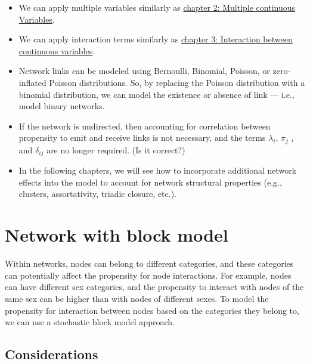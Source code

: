 \documentclass[
  letterpaper,
  DIV=11,
  numbers=noendperiod]{scrreprt}
\begin{document}
\begin{tcolorbox}
\begin{itemize}
\item
  We can apply multiple variables similarly as
  \href{2.\%20Multiple\%20continuous\%20Variables.qmd}{chapter 2:
  Multiple continuous Variables}.
\item
  We can apply interaction terms similarly as
  \href{3.\%20Interaction\%20between\%20continuous\%20variables.qmd}{chapter
  3: Interaction between continuous variables}.
\item
  Network links can be modeled using Bernoulli, Binomial, Poisson, or
  zero-inflated Poisson distributions. So, by replacing the Poisson
  distribution with a binomial distribution, we can model the existence
  or absence of link --- i.e., model binary networks.
\item
  If the network is undirected, then accounting for correlation between
  propensity to emit and receive links is not necessary, and the terms
  \(\lambda_i\), \(\pi_j\) , and \(\delta_{ij}\) are no longer required.
  (Is it correct?)
\item
  In the following chapters, we will see how to incorporate additional
  network effects into the model to account for network structural
  properties (e.g., clusters, assortativity, triadic closure, etc.).
\end{itemize}

\end{tcolorbox}


\chapter{Network with block model}\label{network-with-block-model}

Within networks, nodes can belong to different categories, and these
categories can potentially affect the propensity for node interactions.
For example, nodes can have different sex categories, and the propensity
to interact with nodes of the same sex can be higher than with nodes of
different sexes. To model the propensity for interaction between nodes
based on the categories they belong to, we can use a stochastic block
model approach.

\section{Considerations}\label{considerations-18}
\end{document}
